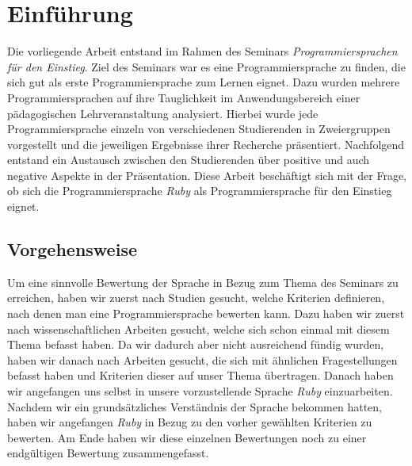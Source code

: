 \documentclass[12pt,DIV=14, version=first, BCOR=10mm,a4paper,twoside,parskip=half-,headsepline,headinclude]{scrartcl}
\begin{document}
\pagebreak
  \tableofcontents  %

\pagebreak

%



\section{Einführung}
\begin{flushleft}
Die vorliegende Arbeit entstand im Rahmen des Seminars \textit{\glqq Programmiersprachen für den Einstieg\grqq}. Ziel des Seminars war es eine Programmiersprache zu finden, die sich gut als erste Programmiersprache zum Lernen eignet. Dazu wurden mehrere Programmiersprachen auf ihre Tauglichkeit im Anwendungsbereich einer pädagogischen Lehrveranstaltung analysiert. Hierbei wurde jede Programmiersprache einzeln von verschiedenen Studierenden in Zweiergruppen vorgestellt und die jeweiligen Ergebnisse ihrer Recherche präsentiert. Nachfolgend entstand ein Austausch zwischen den Studierenden über positive und auch negative Aspekte in der Präsentation. Diese Arbeit beschäftigt sich mit der Frage, ob sich die Programmiersprache \textit{\glqq Ruby\grqq} als Programmiersprache für den Einstieg eignet.
\end{flushleft}

\subsection{Vorgehensweise}
\begin{flushleft}
Um eine sinnvolle Bewertung der Sprache in Bezug zum Thema des Seminars zu erreichen, haben wir zuerst nach Studien gesucht, welche Kriterien definieren, nach denen man eine Programmiersprache bewerten kann. Dazu haben wir zuerst nach wissenschaftlichen Arbeiten gesucht, welche sich schon einmal mit diesem Thema befasst haben. Da wir dadurch aber nicht ausreichend fündig wurden, haben wir danach nach Arbeiten gesucht, die sich mit ähnlichen Fragestellungen befasst haben und Kriterien dieser auf unser Thema übertragen. Danach haben wir angefangen uns selbst in unsere vorzustellende Sprache \textit{\glqq Ruby\grqq} einzuarbeiten. Nachdem wir ein grundsätzliches Verständnis der Sprache bekommen hatten, haben wir angefangen \textit{\glqq Ruby\grqq} in Bezug zu den vorher gewählten Kriterien zu bewerten. Am Ende haben wir diese einzelnen Bewertungen noch zu einer endgültigen Bewertung zusammengefasst.
\end{flushleft}
\end{document}
